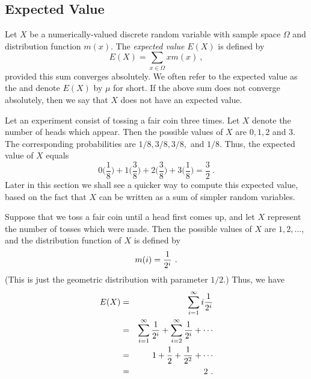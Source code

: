\subsection*{Expected Value}

\begin{definition}\label{def 6.1}  Let $X$ be a numerically-valued discrete random
variable with sample space $\Omega$ and distribution function $m(x)$.  The {\em
expected value} $E(X)$ is defined by
$$ E(X) = \sum_{x \in \Omega} x m(x)\ ,
$$ provided this sum converges absolutely.  We often refer to the expected value as
the  and denote $E(X)$ by $\mu$ for short.  If the above sum does not
converge absolutely, then we say that $X$ does not have an expected value.
\end{definition}

\begin{example}\label{exam 6.03} Let an experiment consist of tossing a fair coin
three times.  Let $X$ denote the number of heads which appear.  Then the possible
values of $X$ are $0, 1, 2$ and $3$.  The corresponding probabilities are $1/8, 3/8,
3/8,$ and $1/8$.  Thus, the expected value of
$X$ equals 
$$0\biggl(\frac 18\biggr) + 1\biggl(\frac 38\biggr) + 2\biggl(\frac 38\biggr) +
3\biggl(\frac 18\biggr) = \frac 32\ .$$   Later in this section we shall see a
quicker way to compute this expected value,  based on the fact that $X$ can be
written as a sum of simpler random variables.
\end{example}


\begin{example}\label{exam 6.05} Suppose that we toss a fair coin until a head first
comes up, and let $X$ represent the number of tosses which were made.  Then the
possible values of $X$ are $1, 2, \ldots$, and the distribution function of $X$ is
defined by
$$m(i) = {1\over {2^i}}\ .$$ (This is just the geometric distribution with parameter
$1/2$.)  Thus, we have
\begin{eqnarray*}  E(X) & = &\sum_{i = 1}^\infty i {1\over{2^i}} \\ & = & \sum_{i =
1}^\infty {1\over{2^i}} + \sum_{i = 2}^\infty {1\over{2^i}} + \cdots \\ & = & 1 +
{1\over 2} + {1\over{2^2}} + \cdots \\ & = & 2\ .
\end{eqnarray*}

\end{example}

